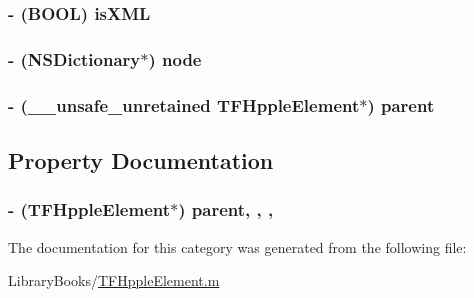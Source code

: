 \subsubsection[{is\+X\+M\+L}]{\setlength{\rightskip}{0pt plus 5cm}-\/ (B\+O\+O\+L) is\+X\+M\+L\hspace{0.3cm}{\ttfamily [protected]}}\label{category_t_f_hpple_element_07_08_a41941751fd0f1fdf6c18c0f90c5991cb}
\hypertarget{category_t_f_hpple_element_07_08_a3742b005d3fd31acacff0d1573cb8a89}{}
\subsubsection[{node}]{\setlength{\rightskip}{0pt plus 5cm}-\/ (N\+S\+Dictionary$\ast$) node\hspace{0.3cm}{\ttfamily [protected]}}\label{category_t_f_hpple_element_07_08_a3742b005d3fd31acacff0d1573cb8a89}
\hypertarget{category_t_f_hpple_element_07_08_ac7602bad8a05294a6beecabe01e6e569}{}
\subsubsection[{parent}]{\setlength{\rightskip}{0pt plus 5cm}-\/ (\+\_\+\+\_\+unsafe\+\_\+unretained {\bf T\+F\+Hpple\+Element}$\ast$) parent\hspace{0.3cm}{\ttfamily [protected]}}\label{category_t_f_hpple_element_07_08_ac7602bad8a05294a6beecabe01e6e569}


\subsection{Property Documentation}
\hypertarget{category_t_f_hpple_element_07_08_a3a570a7692ac21f8d4adc52b4c96756c}{}
\subsubsection[{parent}]{\setlength{\rightskip}{0pt plus 5cm}-\/ ({\bf T\+F\+Hpple\+Element}$\ast$) parent\hspace{0.3cm}{\ttfamily [read]}, {\ttfamily [write]}, {\ttfamily [nonatomic]}, {}}\label{category_t_f_hpple_element_07_08_a3a570a7692ac21f8d4adc52b4c96756c}


The documentation for this category was generated from the following file\+:\begin{DoxyCompactItemize}
\item 
Library\+Books/\hyperlink{_t_f_hpple_element_8m}{T\+F\+Hpple\+Element.\+m}\end{DoxyCompactItemize}
